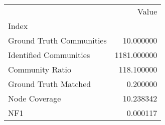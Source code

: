 \begin{tabular}{lr}
\toprule
{} &        Value \\
Index                    &              \\
\midrule
Ground Truth Communities &    10.000000 \\
Identified Communities   &  1181.000000 \\
Community Ratio          &   118.100000 \\
Ground Truth Matched     &     0.200000 \\
Node Coverage            &    10.238342 \\
NF1                      &     0.000117 \\
\bottomrule
\end{tabular}
